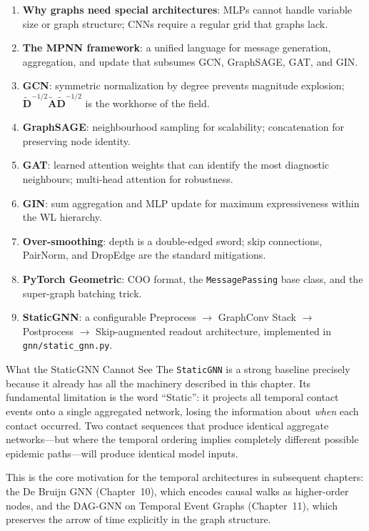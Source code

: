 \begin{enumerate}
    \item \textbf{Why graphs need special architectures}: MLPs cannot handle variable size or graph structure; CNNs require a regular grid that graphs lack.
    \item \textbf{The MPNN framework}: a unified language for message generation, aggregation, and update that subsumes GCN, GraphSAGE, GAT, and GIN.
    \item \textbf{GCN}: symmetric normalization by degree prevents magnitude explosion; $\tilde{\mathbf{D}}^{-1/2}\tilde{\mathbf{A}}\tilde{\mathbf{D}}^{-1/2}$ is the workhorse of the field.
    \item \textbf{GraphSAGE}: neighbourhood sampling for scalability; concatenation for preserving node identity.
    \item \textbf{GAT}: learned attention weights that can identify the most diagnostic neighbours; multi-head attention for robustness.
    \item \textbf{GIN}: sum aggregation and MLP update for maximum expressiveness within the WL hierarchy.
    \item \textbf{Over-smoothing}: depth is a double-edged sword; skip connections, PairNorm, and DropEdge are the standard mitigations.
    \item \textbf{PyTorch Geometric}: COO format, the \texttt{MessagePassing} base class, and the super-graph batching trick.
    \item \textbf{StaticGNN}: a configurable Preprocess $\to$ GraphConv Stack $\to$ Postprocess $\to$ Skip-augmented readout architecture, implemented in \texttt{gnn/static\_gnn.py}.
\end{enumerate}

\begin{keyinsight}{What the StaticGNN Cannot See}
The \texttt{StaticGNN} is a strong baseline precisely because it already has all the machinery described in this chapter. Its fundamental limitation is the word ``Static'': it projects all temporal contact events onto a single aggregated network, losing the information about \emph{when} each contact occurred. Two contact sequences that produce identical aggregate networks---but where the temporal ordering implies completely different possible epidemic paths---will produce identical model inputs.

This is the core motivation for the temporal architectures in subsequent chapters: the De Bruijn GNN (Chapter~10), which encodes causal walks as higher-order nodes, and the DAG-GNN on Temporal Event Graphs (Chapter~11), which preserves the arrow of time explicitly in the graph structure.
\end{keyinsight}

